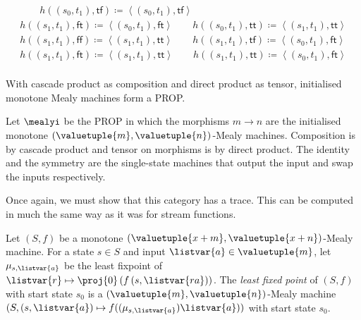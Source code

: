 \begin{example}
\begin{gather*}
        \qquad
        h((s_0, t_1), \mathsf{tf})
        \coloneqq
        \left\langle(s_0, t_1), \mathsf{tf}\right\rangle
        \\
        h((s_1, t_1), \mathsf{ft})
        \coloneqq
        \left\langle(s_0, t_1), \mathsf{ft}\right\rangle
        \qquad
        h((s_0, t_1), \mathsf{tt})
        \coloneqq
        \left\langle(s_1, t_1), \mathsf{tt}\right\rangle
        \\
        h((s_1, t_1), \mathsf{ff})
        \coloneqq
        \left\langle(s_1, t_1), \mathsf{tt}\right\rangle
        \qquad
        h((s_1, t_1), \mathsf{tf})
        \coloneqq
        \left\langle(s_0, t_1), \mathsf{ft}\right\rangle
        \\
        h((s_1, t_1), \mathsf{ft})
        \coloneqq
        \left\langle(s_1, t_1), \mathsf{tt}\right\rangle
        \qquad
        h((s_1, t_1), \mathsf{tt})
        \coloneqq
        \left\langle(s_0, t_1), \mathsf{ft}\right\rangle
        \\
        
    \end{gather*}
\end{example}

With cascade product as composition and direct product as tensor, initialised
monotone Mealy machines form a PROP.

\begin{definition}
    Let \(\mealyi\) be the PROP in which the morphisms
    \(m \to n\) are the initialised monotone
    \((\valuetuple{m}, \valuetuple{n})\)-Mealy machines.
    Composition is by cascade product and tensor on morphisms is by
    direct product.
    The identity and the symmetry are the single-state machines that output the
    input and swap the inputs respectively.
\end{definition}

Once again, we must show that this category has a trace.
This can be computed in much the same way as it was for stream functions.

\begin{definition}
    Let \((S, f)\) be a monotone \(
    (\valuetuple{x+m}, \valuetuple{x+n})
    \)-Mealy machine.
    For a state \(s \in S\) and input \(\listvar{a} \in \valuetuple{m}\), let
    \(\mu_{s,\listvar{a}}\) be the least fixpoint of \(
    \listvar{r} \mapsto \proj{0}\left(f\left(s, \listvar{ra}\right)\right)
    \).
    The \emph{least fixed point} of \((S, f)\) with start state \(s_0\) is a \(
    (\valuetuple{m}, \valuetuple{n})
    \)-Mealy machine \(
    (S, (s, \listvar{a}) \mapsto f((\mu_{s,\listvar{a}})\listvar{a}))
    \) with start state \(s_0\).
\end{definition}

